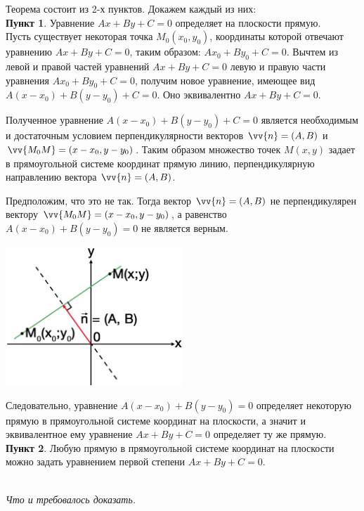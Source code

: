 \documentclass[a4paper,12pt,oneside]{extbook}
\newcommand{\newpar}{$ $\par\nobreak\ignorespaces}
\theoremstyle{numbered}
\theoremstyle{unnumbered}
\theoremstyle{named}
\theoremstyle{unnumbered}
\theoremstyle{named}
\theoremstyle{named}
\theoremstyle{named}
\renewenvironment{proof}[1][]{\breakenv[Доказательство]{\if\relax\detokenize{#1}\relax\else\;\fi}{\textbf{#1}}}{\smallskip\newpar \hfill\textit{Что и требовалось доказать.}}
\begin{document}
\begin{proof}

    Теорема состоит из 2-х пунктов.
    Докажем каждый из них: \\

    \textbf{Пункт 1}. Уравнение \(Ax + By + C = 0\) определяет на плоскости прямую. \\

    Пусть существует некоторая точка \(M_0(x_0, y_0)\), координаты которой отвечают уравнению \(Ax + By + C = 0\), таким образом: \(Ax_0 + By_0 + C = 0\).
    Вычтем из левой и правой частей уравнений \(Ax + By + C = 0\) левую и правую части уравнения \(Ax_0 + By_0 + C = 0\), получим новое уравнение, имеющее вид \(A(x - x_0) + B(y - y_0) + C = 0\).
    Оно эквивалентно \(Ax + By + C = 0\).

    Полученное уравнение \(A(x - x_0) + B(y - y_0) + C = 0\) является необходимым и достаточным условием перпендикулярности векторов \(\vv{n} = (A, B)\) и \(\vv{M_0M} = (x - x_0, y - y_0)\).
    Таким образом множество точек \(M(x, y)\) задает в прямоугольной системе координат прямую линию, перпендикулярную направлению вектора \(\vv{n} = (A, B)\).

    Предположим, что это не так. Тогда вектор \(\vv{n} = (A, B)\) не перпендикулярен вектору \(\vv{M_0M} = (x - x_0, y - y_0)\), а равенство \(A(x - x_0) + B(y - y_0) = 0\) не является верным.

    \begin{center}
        \includegraphics[width=0.5\textwidth]{general_line.png}
    \end{center}

    Следовательно, уравнение \(A(x - x_0) + B(y - y_0) = 0\) определяет некоторую прямую в прямоугольной системе координат на плоскости, а значит и эквивалентное ему уравнение \(Ax + By + C = 0\) определяет ту же прямую. \\

    \textbf{Пункт 2}. Любую прямую в прямоугольной системе координат на плоскости можно задать уравнением первой степени \(Ax + By + C = 0\). \\


\end{proof}
\end{document}
